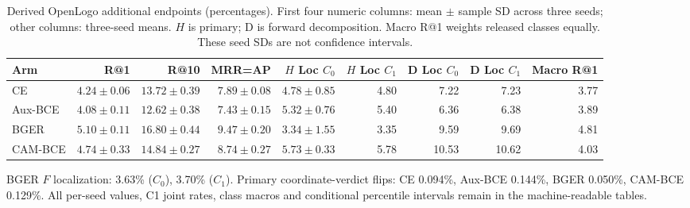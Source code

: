 \begin{table}[t]
\centering\small\setlength{\tabcolsep}{4pt}
\caption{Derived OpenLogo additional endpoints (percentages). First four
numeric columns: mean $\pm$ sample SD across three seeds; other columns:
three-seed means. $H$ is primary; D is forward decomposition. Macro R@1
weights released classes equally. These seed SDs are not confidence intervals.}
\label{tab:openlogo-full}
\begin{tabular}{@{}lrrrrrrrr@{}}
\toprule
Arm & R@1 & R@10 & MRR=AP & $H$ Loc $C_0$ & $H$ Loc $C_1$ & D Loc $C_0$ & D Loc $C_1$ & Macro R@1\\
\midrule
CE & $4.24\pm0.06$ & $13.72\pm0.39$ & $7.89\pm0.08$ & $4.78\pm0.85$ & 4.80 & 7.22 & 7.23 & 3.77\\
Aux-BCE & $4.08\pm0.11$ & $12.62\pm0.38$ & $7.43\pm0.15$ & $5.32\pm0.76$ & 5.40 & 6.36 & 6.38 & 3.89\\
BGER & $5.10\pm0.11$ & $16.80\pm0.44$ & $9.47\pm0.20$ & $3.34\pm1.55$ & 3.35 & 9.59 & 9.69 & 4.81\\
CAM-BCE & $4.74\pm0.33$ & $14.84\pm0.27$ & $8.74\pm0.27$ & $5.73\pm0.33$ & 5.78 & 10.53 & 10.62 & 4.03\\
\bottomrule\end{tabular}
\par\smallskip\raggedright BGER $F$ localization: 3.63\% ($C_0$), 3.70\% ($C_1$).
Primary coordinate-verdict flips: CE 0.094\%, Aux-BCE 0.144\%, BGER 0.050\%,
CAM-BCE 0.129\%. All per-seed values, C1 joint rates, class macros and
conditional percentile intervals remain in the machine-readable tables.
\end{table}
